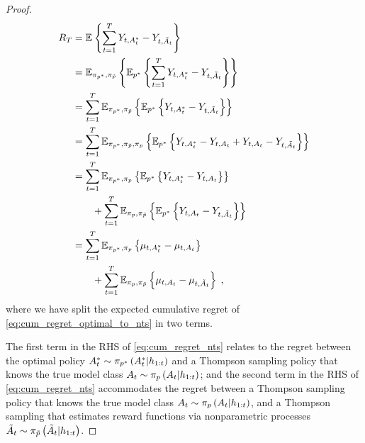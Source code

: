 \begin{proof}
\begin{align}
R_T &=\mathbb{E}_{}\left\{ \sum_{t=1}^T Y_{t,A^*_t}-Y_{t,\tilde{A}_t}  \right\} \label{eq:cum_regret_optimal_to_nts} \\
&=\mathbb{E}_{\pi_{p^*},\pi_{\tilde{p}}}\left\{ \mathbb{E}_{p^*}\left\{ 
		\sum_{t=1}^T Y_{t,A^*_t}-Y_{t,\tilde{A}_t} 
	 \right\}
	 \right\} \\
&=\sum_{t=1}^T \mathbb{E}_{\pi_{p^*},\pi_{\tilde{p}}}\left\{ \mathbb{E}_{p^*}\left\{  Y_{t,A^*_t}-Y_{t,\tilde{A}_t} \right\} \right\} \\
&=\sum_{t=1}^T \mathbb{E}_{\pi_{p^*},\pi_{\tilde{p}},\pi_{p}}\left\{ \mathbb{E}_{p^*}\left\{  Y_{t,A^*_t}-Y_{t,A_t}+Y_{t,A_t}-Y_{t,\tilde{A}_t} \right\} \right\} \\
&=\sum_{t=1}^T \mathbb{E}_{\pi_{p^*},\pi_{p}}\left\{ \mathbb{E}_{p^*}\left\{  Y_{t,A^*_t}-Y_{t,A_t} \right\} \right\} \nonumber \\
& \qquad + \sum_{t=1}^T \mathbb{E}_{\pi_{p},\pi_{\tilde{p}}}\left\{ \mathbb{E}_{p^*}\left\{  Y_{t,A_t}-Y_{t,\tilde{A}_t} \right\} \right\} \\
&=\sum_{t=1}^T \mathbb{E}_{\pi_{p^*},\pi_{p}}\left\{ \mu_{t,A^*_t}-\mu_{t,A_t}  \right\} \nonumber \\
& \qquad + \sum_{t=1}^T \mathbb{E}_{\pi_{p},\pi_{\tilde{p}}}\left\{ \mu_{t,A_t}-\mu_{t,\tilde{A}_t}  \right\} \; , \label{eq:cum_regret_nts} 
\end{align}
where we have split the expected cumulative regret of \autoref{eq:cum_regret_optimal_to_nts} in two terms.

The first term in the RHS of \autoref{eq:cum_regret_nts} relates to the regret between the optimal policy $A^*_t \sim \pi_{p^*}\left( A^*_t|h_{1:t} \right)$ and a Thompson sampling policy that knows the true model class $A_t \sim \pi_{p}\left( A_t|h_{1:t} \right)$; and the second term in the RHS of \autoref{eq:cum_regret_nts} accommodates the regret between a Thompson sampling policy that knows the true model class $A_t \sim \pi_{p}\left( A_t|h_{1:t} \right)$, and a Thompson sampling that estimates reward functions via nonparametric processes $\tilde{A}_t \sim \pi_{\tilde{p}}\left( \tilde{A}_t|h_{1:t} \right)$.


\end{proof}
